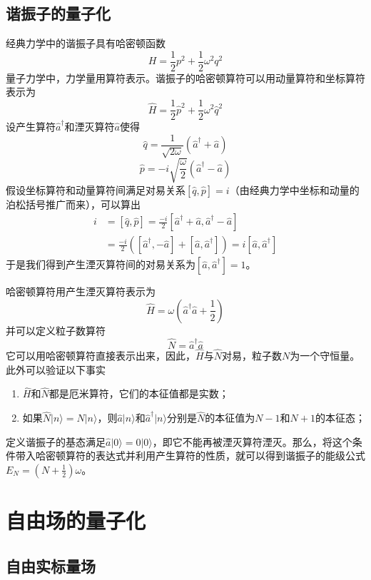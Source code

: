 \documentclass[a4paper,11pt]{ctexart}
\newcommand{\beq}{\begin{equation}}
\newcommand{\eeq}{\end{equation}}
\newcommand{\bea}{\begin{equation}\begin{aligned}}
\newcommand{\eea}{\end{aligned}\end{equation}}
\begin{document}
\subsection{谐振子的量子化}
经典力学中的谐振子具有哈密顿函数
\beq
H = \frac{1}{2}p^2 + \frac{1}{2}\omega^2 q^2
\eeq
量子力学中，力学量用算符表示。谐振子的哈密顿算符可以用动量算符和坐标算符表示为
\beq
\hat{H} = \frac{1}{2} \hat{p}^2 + \frac{1}{2}\omega^2 \hat{q}^2
\eeq
设产生算符$\hat{a}^\dagger$和湮灭算符$\hat{a}$使得
\beq
\hat{q} = \frac{1}{\sqrt{2\omega}}(\hat{a}^\dagger + \hat{a})
\eeq
\beq
\hat{p} = -i \sqrt{\frac{\omega}{2}}(\hat{a}^\dagger - \hat{a})
\eeq
假设坐标算符和动量算符间满足对易关系$[\hat{q},\hat{p}] = i$（由经典力学中坐标和动量的泊松括号推广而来），可以算出
\bea
i &= [\hat{q},\hat{p}] = \frac{-i}{2} [\hat{a}^\dagger + \hat{a},\hat{a}^\dagger - \hat{a}] \\
&= \frac{-i}{2}( [\hat{a}^\dagger,-\hat{a}] + [\hat{a},\hat{a}^\dagger] ) = i [\hat{a},\hat{a}^\dagger]
\eea
于是我们得到产生湮灭算符间的对易关系为$[\hat{a},\hat{a}^\dagger] = 1$。
\par
哈密顿算符用产生湮灭算符表示为
\beq
\hat{H} = \omega(\hat{a}^\dagger \hat{a} + \frac{1}{2})
\eeq
并可以定义粒子数算符
\beq
\hat{N} = \hat{a}^\dagger \hat{a}
\eeq
它可以用哈密顿算符直接表示出来，因此，$\hat{H}$与$\hat{N}$对易，粒子数$N$为一个守恒量。此外可以验证以下事实
\begin{enumerate}
\item $\hat{H}$和$\hat{N}$都是厄米算符，它们的本征值都是实数；
\item 如果$\hat{N}|n\rangle = N |n\rangle$，则$\hat{a}|n\rangle$和$\hat{a}^\dagger |n\rangle$分别是$\hat{N}$的本征值为$N-1$和$N+1$的本征态；
\end{enumerate}
\par
定义谐振子的基态满足$\hat{a} |0\rangle = 0|0\rangle$，即它不能再被湮灭算符湮灭。那么，将这个条件带入哈密顿算符的表达式并利用产生算符的性质，就可以得到谐振子的能级公式$E_N = (N+ \frac{1}{2})\omega$。

\section{自由场的量子化}
\subsection{自由实标量场}
\end{document}
